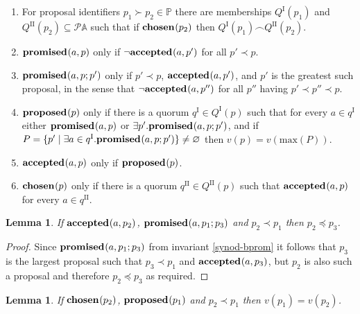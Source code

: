 \documentclass[journal]{IEEEtran}
\newtheorem{lemma}[theorem]{Lemma}
\begin{document}
\begin{enumerate}

\item \label{synod-quorums} For proposal identifiers $p_1 \succ p_2 \in \mathbb
P$ there are memberships $Q^\textrm{I}(p_1)$ and $Q^\textrm{II}(p_2) \subseteq
\mathcal P \mathbb A$ such that if $\mathbf{chosen}_{}(p_2)$ then ${Q^\textrm{I}(p_1)
\frown Q^\textrm{II}(p_2)}$.

\item \label{synod-fprom} $\mathbf{promised}_{}(a,p)$ only if $\neg\mathbf{accepted}_{}(a,p')$ for all
${p' \prec p}$.

\item \label{synod-bprom} $\mathbf{promised}_{}(a,p;p')$ only if $p' \prec p$,
$\mathbf{accepted}_{}(a,p')$, and $p'$ is the greatest such proposal, in the sense that
$\neg\mathbf{accepted}_{}(a,p'')$ for all $p''$ having $p' \prec p'' \prec p$.

\item \label{synod-prop} $\mathbf{proposed}_{}(p)$ only if there is a quorum $q^\textrm{I}
\in Q^\textrm{I}(p)$ such that for every $a \in q^\textrm{I}$ either
$\mathbf{promised}_{}(a,p)$ or $\exists p'.  \mathbf{promised}_{}(a,p;p')$, and if $P = \{ p' \mid
\exists a \in q^\textrm{I}. \mathbf{promised}_{}(a,p;p') \} \ne \varnothing$ then $v(p) =
v(\mathrm{max}(P))$.

\item \label{synod-acc} $\mathbf{accepted}_{}(a,p)$ only if $\mathbf{proposed}_{}(p)$.

\item \label{synod-chosen} $\mathbf{chosen}_{}(p)$ only if there is a quorum
$q^\textrm{II} \in Q^\textrm{II}(p)$ such that $\mathbf{accepted}_{}(a,p)$ for every $a \in
q^\textrm{II}$.

\end{enumerate}

\begin{lemma}\label{synod-acc-bprom}If $\mathbf{accepted}_{}(a,p_2)$, $\mathbf{promised}_{}(a,p_1;p_3)$
and $p_2 \prec p_1$ then $p_2 \preceq p_3$.\end{lemma}

\begin{proof}Since $\mathbf{promised}_{}(a,p_1;p_3)$ from invariant \ref{synod-bprom} it
follows that $p_3$ is the largest proposal such that $p_3 \prec p_1$ and
$\mathbf{accepted}_{}(a,p_3)$, but $p_2$ is also such a proposal and therefore $p_2
\preceq p_3$ as required.  \end{proof}

\begin{lemma}\label{synod-lemma} If $\mathbf{chosen}_{}(p_2)$, $\mathbf{proposed}_{}(p_1)$ and $p_2
\prec p_1$ then $v(p_1) = v(p_2)$. \end{lemma}
\end{document}

